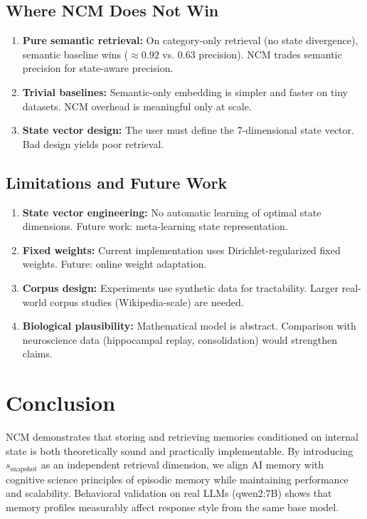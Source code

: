 \documentclass[10pt,twocolumn,letterpaper]{article}
\begin{document}
\subsection{Where NCM Does Not Win}

\begin{enumerate}
  \item \textbf{Pure semantic retrieval:} On category-only retrieval (no state divergence), semantic baseline wins ($\approx 0.92$ vs. $0.63$ precision). NCM trades semantic precision for state-aware precision.
  
  \item \textbf{Trivial baselines:} Semantic-only embedding is simpler and faster on tiny datasets. NCM overhead is meaningful only at scale.
  
  \item \textbf{State vector design:} The user must define the 7-dimensional state vector. Bad design yields poor retrieval.
\end{enumerate}

\subsection{Limitations and Future Work}

\begin{enumerate}
  \item \textbf{State vector engineering:} No automatic learning of optimal state dimensions. Future work: meta-learning state representation.
  
  \item \textbf{Fixed weights:} Current implementation uses Dirichlet-regularized fixed weights. Future: online weight adaptation.
  
  \item \textbf{Corpus design:} Experiments use synthetic data for tractability. Larger real-world corpus studies (Wikipedia-scale) are needed.
  
  \item \textbf{Biological plausibility:} Mathematical model is abstract. Comparison with neuroscience data (hippocampal replay, consolidation) would strengthen claims.
\end{enumerate}

\section{Conclusion}
\label{sec:conclusion}

NCM demonstrates that storing and retrieving memories conditioned on internal state is both theoretically sound and practically implementable. By introducing $s_{\text{snapshot}}$ as an independent retrieval dimension, we align AI memory with cognitive science principles of episodic memory while maintaining performance and scalability. Behavioral validation on real LLMs (qwen2:7B) shows that memory profiles measurably affect response style from the same base model.
\end{document}
